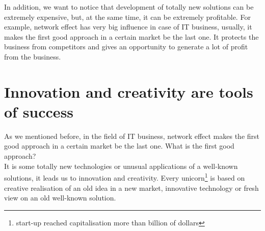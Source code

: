 \documentclass[english]{article}
\begin{document}
In addition, we want to notice that development of totally new solutions can be extremely expensive, but, at the same time, it can be extremely profitable. For example, network effect has very big influence in case of IT business, usually, it makes the first good approach in a certain market be the last one. It protects the business from competitors and gives an opportunity to generate a lot of profit from the business.

\section{Innovation and creativity are tools of success}

As we mentioned before, in the field of IT business, network effect makes the first good approach in a certain market be the last one. What is the first good approach? \\
It is some totally new technologies or unusual applications of a well-known solutions, it leads us to innovation and creativity. Every unicorn\footnote{start-up reached capitalisation more than billion of dollars} is based on creative realisation of an old idea in a new market, innovative technology or fresh view on an old well-known solution.
\end{document}

